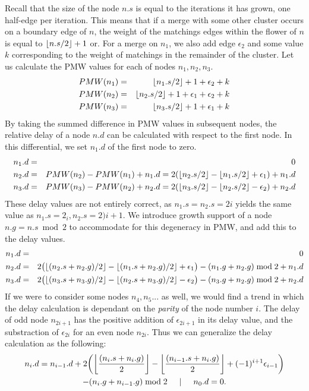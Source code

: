 Recall that the size of the node $n.s$ is equal to the iterations it has grown, one half-edge per iteration. This means that if a merge with some other cluster occurs on a boundary edge of $n$, the weight of the matchings edges within the flower of $n$ is equal to ${\left \lfloor n.s/2 \right \rfloor }+1$ or. For a merge on $n_1$, we also add edge $\epsilon_2$ and some value $k$ corresponding to the weight of matchings in the remainder of the cluster. Let us calculate the PMW values for each of nodes $n_1, n_2, n_3$.
\begin{eqnarray*}
  PMW(n_1) &=& {\left \lfloor n_1.s/2 \right \rfloor }+1 + \epsilon_2 + k \\
  PMW(n_2) &=& {\left \lfloor n_2.s/2 \right \rfloor }+1 + \epsilon_1 + \epsilon_2 + k \\
  PMW(n_3) &=& {\left \lfloor n_3.s/2 \right \rfloor }+1 + \epsilon_1 +k
\end{eqnarray*}
By taking the summed difference in PMW values in subsequent nodes, the relative delay of a node $n.d$ can be calculated with respect to the first node. In this differential, we set $n_1.d$ of the first node to zero.
\begin{eqnarray*}
  n_1.d &=& 0 \\
  n_2.d &=& PMW(n_2) - PMW(n_1) + n_1.d = 2({\left \lfloor n_2.s/2 \right \rfloor } - {\left \lfloor n_1.s/2 \right \rfloor } + \epsilon_1) + n_1.d \\
  n_3.d &=& PMW(n_3) - PMW(n_2) + n_2.d = 2({\left \lfloor n_3.s/2 \right \rfloor } - {\left \lfloor n_2.s/2 \right \rfloor } - \epsilon_2) + n_2.d
\end{eqnarray*}
These delay values are not entirely correct, as $n_1.s = n_2.s = 2i$ yields the same value as  $n_1.s = 2_i,  n_2.s = 2)i + 1$. We introduce growth support of a node $n.g = n.s \bmod 2$ to accommodate for this degeneracy in PMW, and add this to the delay values.
\begin{eqnarray*}
  n_1.d &=& 0 \\
  n_2.d &=& 2\big({\left \lfloor (n_2.s+n_2.g)/2 \right \rfloor } - {\left \lfloor (n_1.s+n_2.g)/2 \right \rfloor } + \epsilon_1\big) - (n_1.g + n_2.g)\bmod 2 + n_1.d \\
  n_3.d &=& 2\big({\left \lfloor (n_3.s+n_3.g)/2 \right \rfloor } - {\left \lfloor (n_2.s+n_3.g)/2 \right \rfloor } - \epsilon_2\big) - (n_3.g + n_2.g)\bmod 2 + n_2.d
\end{eqnarray*}
If we were to consider some nodes $n_4, n_5...$ as well, we would find a trend in which the delay calculation is dependant on the \emph{parity} of the node number $i$. The delay of odd node $n_{2i+1}$ has the positive addition of $\epsilon_{2i+1}$ in its delay value, and the substraction of $\epsilon_{2i}$ for an even node $n_{2i}$. Thus we can generalize the delay calculation as the following:
\begin{multline}\label{eq:1ddelay}
n_i.d = n_{i-1}.d + 2\bigg({\left \lfloor \frac{(n_i.s+n_i.g)}{2} \right \rfloor } - {\left \lfloor \frac{(n_{i-1}.s+n_i.g)}{2} \right \rfloor } + (-1)^{i+1}\epsilon_{i-1}\bigg) \\
         - (n_{i}.g + n_{i-1}.g)\bmod 2 \hspace{.5cm} | \hspace{.5cm} n_0.d = 0.
\end{multline}

